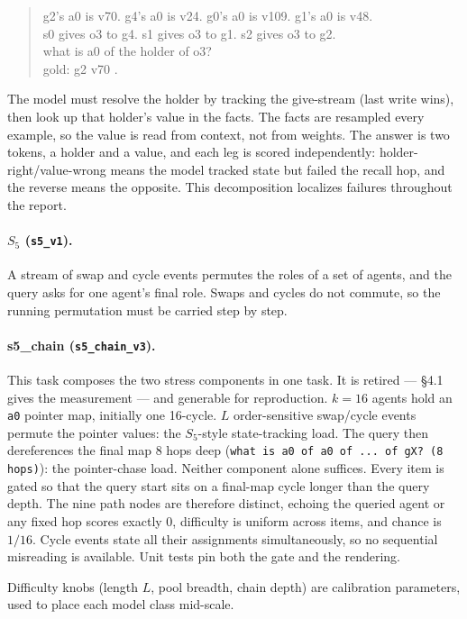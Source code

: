 \documentclass[11pt]{article}
\newcommand{\Sfive}{$S_5$}
\newcommand{\code}[1]{\texttt{#1}}
\begin{document}
\begin{quote}\small\ttfamily
g2's a0 is v70. g4's a0 is v24. g0's a0 is v109. g1's a0 is v48.\\
s0 gives o3 to g4. s1 gives o3 to g1. s2 gives o3 to g2.\\
what is a0 of the holder of o3?\\
gold: g2 v70 .
\end{quote}

The model must resolve the holder by tracking the give-stream (last write wins), then look up
that holder's value in the facts. The facts are resampled every example, so the value is read
from context, not from weights. The answer is two tokens, a holder and a value, and each leg
is scored independently: holder-right/value-wrong means the model tracked state but failed the
recall hop, and the reverse means the opposite. This decomposition localizes failures
throughout the report.

\paragraph{\Sfive{} (\code{s5\_v1}).} A stream of swap and cycle events permutes the roles of
a set of agents, and the query asks for one agent's final role. Swaps and cycles do not
commute, so the running permutation must be carried step by step.

\paragraph{s5\_chain (\code{s5\_chain\_v3}).} This task composes the two stress components in one task. It is retired --- \S4.1 gives the measurement --- and generable for reproduction. $k=16$ agents hold an \code{a0} pointer map, initially one 16-cycle. $L$
order-sensitive swap/cycle events permute the pointer values: the \Sfive-style state-tracking
load. The query then dereferences the final map 8 hops deep (\code{what is a0 of a0 of ... of
gX? (8 hops)}): the pointer-chase load. Neither component alone suffices. Every item is gated so that the query start sits on a final-map cycle longer than the query depth. The nine path nodes are therefore distinct, echoing the queried agent or any fixed hop scores exactly 0, difficulty is uniform across items, and chance is $1/16$. Cycle events state all their assignments simultaneously, so no sequential misreading is available. Unit tests pin both the gate and the rendering.

Difficulty knobs (length $L$, pool breadth, chain depth) are calibration parameters, used to
place each model class mid-scale.
\end{document}
